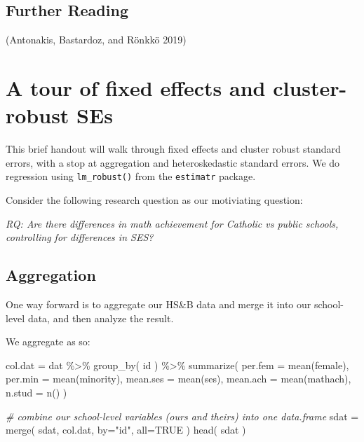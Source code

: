 \documentclass[
  letterpaper,
  DIV=11,
  numbers=noendperiod]{scrreprt}
\newenvironment{Shaded}{}{}
\newcommand{\AttributeTok}[1]{\textcolor[rgb]{0.49,0.56,0.16}{#1}}
\newcommand{\CommentTok}[1]{\textcolor[rgb]{0.38,0.63,0.69}{\textit{#1}}}
\newcommand{\ConstantTok}[1]{\textcolor[rgb]{0.53,0.00,0.00}{#1}}
\newcommand{\FunctionTok}[1]{\textcolor[rgb]{0.02,0.16,0.49}{#1}}
\newcommand{\NormalTok}[1]{#1}
\newcommand{\OtherTok}[1]{\textcolor[rgb]{0.00,0.44,0.13}{#1}}
\newcommand{\SpecialCharTok}[1]{\textcolor[rgb]{0.25,0.44,0.63}{#1}}
\newcommand{\StringTok}[1]{\textcolor[rgb]{0.25,0.44,0.63}{#1}}
\begin{document}
\section{Further Reading}\label{further-reading-3}

(Antonakis, Bastardoz, and Rönkkö 2019)

\chapter{A tour of fixed effects and cluster-robust
SEs}\label{a-tour-of-fixed-effects-and-cluster-robust-ses}

This brief handout will walk through fixed effects and cluster robust
standard errors, with a stop at aggregation and heteroskedastic standard
errors. We do regression using \texttt{lm\_robust()} from the
\texttt{estimatr} package.

Consider the following research question as our motiviating question:

\emph{RQ: Are there differences in math achievement for Catholic vs
public schools, controlling for differences in SES?}

\section{Aggregation}\label{aggregation}

One way forward is to aggregate our HS\&B data and merge it into our
school-level data, and then analyze the result.

We aggregate as so:

\begin{Shaded}
\begin{Highlighting}[]
\NormalTok{col.dat }\OtherTok{=}\NormalTok{ dat }\SpecialCharTok{\%\textgreater{}\%} \FunctionTok{group\_by}\NormalTok{( id ) }\SpecialCharTok{\%\textgreater{}\%} 
    \FunctionTok{summarize}\NormalTok{( }\AttributeTok{per.fem =} \FunctionTok{mean}\NormalTok{(female),}
                 \AttributeTok{per.min =} \FunctionTok{mean}\NormalTok{(minority),}
                 \AttributeTok{mean.ses =} \FunctionTok{mean}\NormalTok{(ses),}
                 \AttributeTok{mean.ach =} \FunctionTok{mean}\NormalTok{(mathach),}
                 \AttributeTok{n.stud =} \FunctionTok{n}\NormalTok{() )}

\CommentTok{\# combine our school{-}level variables (ours and theirs) into one data.frame}
\NormalTok{sdat }\OtherTok{=} \FunctionTok{merge}\NormalTok{( sdat, col.dat, }\AttributeTok{by=}\StringTok{"id"}\NormalTok{, }\AttributeTok{all=}\ConstantTok{TRUE}\NormalTok{ )}
\FunctionTok{head}\NormalTok{( sdat )}
\end{Highlighting}
\end{Shaded}
\end{document}
